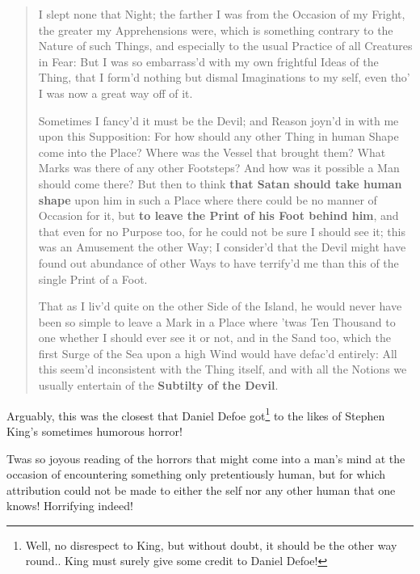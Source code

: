 \documentclass[a4paper]{article}
\begin{document}
\noindent
\begin{minipage}{1\textwidth}
\vspace{1em}
\begin{quotation}
{\ttfamily

I slept none that Night; the farther I was from the Occasion of my Fright, the greater my Apprehensions were, which is something contrary to the Nature of such Things, and especially to the usual Practice of all Creatures in Fear: But I was so embarrass’d with my own frightful Ideas of the Thing, that I form’d nothing but dismal Imaginations to my self, even tho’ I was now a great way off of it.

Sometimes I fancy’d it must be the Devil; and Reason joyn’d in with me upon this Supposition: For how should any other Thing in human Shape come into the Place? Where was the Vessel that brought them? What Marks was there of any other Footsteps? And how was it possible a Man should come there? But then to think \textbf{that Satan should take human shape} upon him in such a Place where there could be no manner of Occasion for it, but \textbf{to leave the Print of his Foot behind him}, and that even for no Purpose too, for he could not be sure I should see it; this was an Amusement the other Way; I consider’d that the Devil might have found out abundance of other Ways to have terrify’d me than this of the single Print of a Foot.

That as I liv’d quite on the other Side of the Island, he would never have been so simple to leave a Mark in a Place where ’twas Ten Thousand to one whether I should ever see it or not, and in the Sand too, which the first Surge of the Sea upon a high Wind would have defac’d entirely: All this seem’d inconsistent with the Thing itself, and with all the Notions we usually entertain of the \textbf{Subtilty of the Devil}.


}
\end{quotation}
\vspace{1em}
\end{minipage}



Arguably, this was the closest that Daniel Defoe got\footnote{Well, no disrespect to King, but without doubt, it should be the other way round.. King must surely give some credit to Daniel Defoe!} to the likes of Stephen King's sometimes humorous horror!

Twas so joyous reading of the horrors that might come into a man's mind at the occasion of encountering something only pretentiously human, but for which attribution could not be made to either the self nor any other human that one knows! Horrifying indeed!
\end{document}
